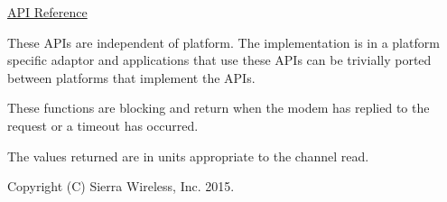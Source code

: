 \hyperlink{pa__adc_8h}{A\+PI Reference}





These A\+P\+Is are independent of platform. The implementation is in a platform specific adaptor and applications that use these A\+P\+Is can be trivially ported between platforms that implement the A\+P\+Is.

These functions are blocking and return when the modem has replied to the request or a timeout has occurred.

The values returned are in units appropriate to the channel read.





Copyright (C) Sierra Wireless, Inc. 2015. 